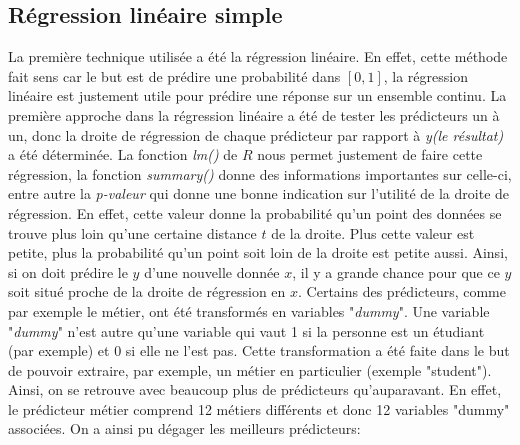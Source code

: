 \documentclass[11pt]{article}
\begin{document}
	\subsection{Régression linéaire simple}
	La première technique utilisée a été la régression linéaire. En effet, cette méthode fait sens car le but est de prédire une probabilité dans $[0,1]$, la régression linéaire est justement utile pour prédire une réponse sur un ensemble continu. 
	La première approche dans la régression linéaire a été de tester les prédicteurs un à un, donc la droite de régression de chaque prédicteur par rapport à \emph{y(le résultat)} a été déterminée. La fonction \emph{lm()} de $R$ nous permet justement de faire cette régression, la fonction \emph{summary()} donne des informations importantes sur celle-ci, entre autre la \emph{p-valeur} qui donne une bonne indication sur l'utilité de la droite de régression. En effet, cette valeur donne la probabilité qu'un point des données se trouve plus loin qu'une certaine distance $t$ de la droite. Plus cette valeur est petite, plus la probabilité qu'un point soit loin de la droite est petite aussi. Ainsi, si on doit prédire le $y$ d'une nouvelle donnée $x$, il y a grande chance pour que ce $y$ soit situé proche de la droite de régression en $x$. 
	Certains des prédicteurs, comme par exemple le métier, ont été transformés en variables "\emph{dummy}". Une variable "\emph{dummy}" n'est autre qu'une variable qui vaut 1 si la personne est un étudiant (par exemple) et 0 si elle ne l'est pas. Cette transformation a été faite dans le but de pouvoir extraire, par exemple, un métier en particulier (exemple "student"). Ainsi, on se retrouve avec beaucoup plus de prédicteurs qu'auparavant. En effet, le prédicteur métier comprend 12 métiers différents et donc 12 variables "dummy" associées.
	On a ainsi pu dégager les meilleurs prédicteurs: 
\end{document}
